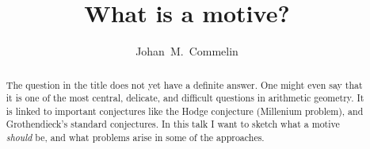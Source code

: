 \documentclass[a4paper,10pt]{article}
\title{What is a motive?}
\author{Johan~M.~Commelin}
\begin{document}
\maketitle

\begin{abstract} %
	The question in the title does not yet have a definite answer. One
	might even say that it is one of the most central, delicate, and
	difficult questions in arithmetic geometry. It is linked to important
	conjectures like the Hodge conjecture (Millenium problem), and
	Grothendieck's standard conjectures. In this talk I want to sketch what
	a motive \emph{should} be, and what problems arise in some of the
	approaches.
\end{abstract} %
\end{document}
